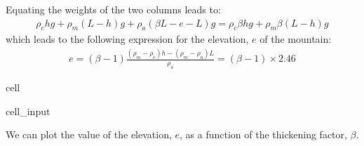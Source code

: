 \documentclass[letterpaper,10pt,english]{jupyterBook}
\begin{document}
\sphinxAtStartPar
Equating the weights of the two columns leads to:
\begin{equation*}
\begin{split}\rho_chg + \rho_m(L-h)g +\rho_a(\beta L-e-L)g = \rho_c\beta hg+\rho_m\beta(L-h)g\end{split}
\end{equation*}
\sphinxAtStartPar
which leads to the following expression for the elevation, \(e\) of the mountain:
\begin{equation*}
\begin{split}e = (\beta-1)\frac{(\rho_m-\rho_c)h-(\rho_m-\rho_a)L}{\rho_a} = (\beta-1)\times 2.46\end{split}
\end{equation*}
\begin{sphinxuseclass}{cell}\begin{sphinxVerbatimInput}

\begin{sphinxuseclass}{cell_input}
\begin{sphinxVerbatim}[commandchars=\\\{\}]
  
        
\end{sphinxVerbatim}

\end{sphinxuseclass}\end{sphinxVerbatimInput}

\end{sphinxuseclass}
\sphinxAtStartPar
We can plot the value of the elevation, \(e\), as a function of the thickening factor, \(\beta\).
\end{document}
